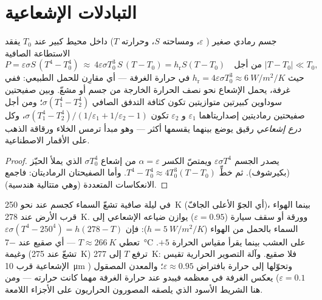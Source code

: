 \section{التبادلات الإشعاعية}

\begin{proposition}\label{prop:b2:thermal-radiation:exchange}
جسم رمادي صغير ( $\varepsilon$، ومساحته $S$، وحرارته $T$)
داخل محيط كبير عند $T_0$ يفقد الاستطاعة الصافية
\[
P = \varepsilon\sigma S\,(T^4 - T_0^4)
\ \approx\ 4\varepsilon\sigma T_0^3\,S\,(T - T_0) = h_{\text{r}}S(T - T_0)
\quad\text{من أجل } |T - T_0| \ll T_0 ,
\]
حيث $h_{\text{r}} = 4\varepsilon\sigma T_0^3 \approx \qty{6}{W/m^2/K}$ في
حرارة الغرفة --- أي مقارِن للحمل الطبيعي: ففي غرفة،
يحمل الإشعاع نحو نصف الحرارة الخارجة من جسم أو مشعّ.
وبين صفيحتين سوداوين كبيرتين متوازيتين تكون كثافة التدفق الصافي
$\sigma(T_1^4 - T_2^4)$؛ ومن أجل صفيحتين رماديتين إصداريتاهما $\varepsilon_1$
و $\varepsilon_2$ تكون $\sigma(T_1^4 - T_2^4)/(1/\varepsilon_1 + 1/\varepsilon_2
- 1)$، وكل \emph{درع إشعاعي} رقيق يوضع بينهما يقسمها
أكثر --- وهو مبدأ ترمس الخلاء ورقاقة الذهب على
الأقمار الاصطناعية.
\end{proposition}

\begin{proof}
يصدر الجسم $\varepsilon\sigma T^4$ ويمتصّ الكسر $\alpha =
\varepsilon$ من إشعاع  $\sigma T_0^4$ الذي يملأ الحيّز
(بكيرشوف). ثم خطِّ $T^4 - T_0^4 \approx 4T_0^3(T - T_0)$. وأما
الصفيحتان الرماديتان: فاجمع الانعكاسات المتعددة (وهي متتالية هندسية).
\end{proof}

\begin{example}\label{ex:b2:thermal-radiation:frost}
في ليلة صافية تشعّ السماء كجسم عند نحو \qty{250}{K}
(أي الجوّ الأعلى الجافّ)، بينما الهواء قرب الأرض عند
\qty{278}{K}. وورقة أو سقف سيارة ($\varepsilon = 0.95$) يوازن
ضياعه الإشعاعي إلى السماء بالحمل من الهواء ($h =
\qty{5}{W/m^2/K}$): فإن $\varepsilon\sigma(T^4 - 250^4) = h(278 - T)$ تعطي $T
\approx \qty{266}{K}$ --- أي صقيع عند \qty{-7}{\celsius} على العشب بينما
يقرأ مقياس الحرارة $+5$. وغيمة (تشعّ عند \qty{275}{K}) ترفع $T$
إلى \qty{277}{K}: فلا صقيع. وآلة التصوير الحرارية تقيس الإشعاعية قرب
\qty{10}{\micro m} وتحوّلها إلى حرارة بافتراض
$\varepsilon \approx 0.95$؛ والمعدن المصقول ($\varepsilon = 0.1$) يعكس
الغرفة في معظمه فيبدو عند حرارة الغرفة مهما كانت حرارته
--- ومن هنا الشريط الأسود الذي يلصقه المصورون الحراريون على الأجزاء اللامعة.
\end{example}

